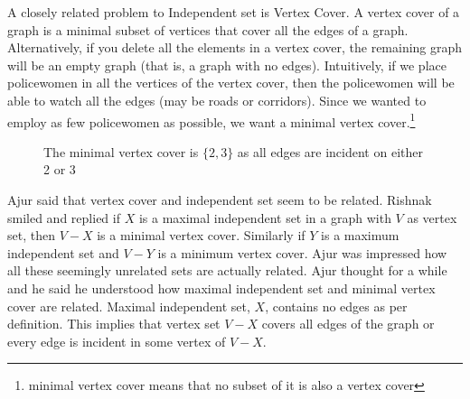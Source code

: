 A closely related problem to Independent set is Vertex Cover. A vertex cover of a graph is a minimal subset of vertices that cover all the edges of a graph. Alternatively, if you delete all the elements in a vertex cover, the remaining graph will be an empty graph (that is, a graph with no edges). Intuitively, if we place policewomen in all the vertices of the vertex cover, then the policewomen will be able to watch all the edges (may be roads or corridors). Since we wanted to employ as few policewomen as possible, we want a minimal vertex cover.\footnote{minimal vertex cover means that no subset of it is also a vertex cover}
\begin{figure}
\begin{center}

\caption{ The minimal vertex cover  is $\{2,3\}$ as all edges are incident on either 2 or 3}\label{13g5}
\end{center}
\end{figure}

Ajur said that vertex cover and independent set seem to be related. Rishnak smiled and replied if $X$ is a maximal independent set in a graph with $V$ as vertex set, then $V-X$ is a minimal vertex cover. Similarly if $Y$ is a maximum independent set and $V-Y$ is a minimum vertex cover. Ajur was impressed how all these seemingly unrelated sets are actually related. Ajur thought for a while and he said he understood how maximal independent set and minimal vertex cover are related. Maximal independent set, $X$, contains no edges as per definition. This implies that vertex set  $V-X$ covers all edges of the graph or every edge is incident in some vertex of $V-X$.

